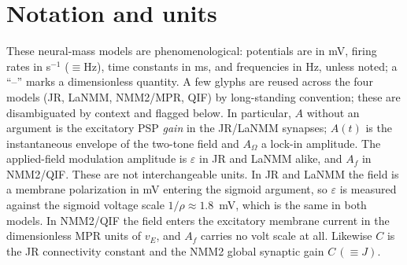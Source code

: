 \documentclass[11pt,a4paper]{article}
\newif\ifappendices
\begin{document}
\fi
\ifappendices
\clearpage
\appendix
\renewcommand{\thefigure}{S\arabic{figure}}
\setcounter{figure}{0}
\makeatletter
\let\ne@stdsection\section
\renewcommand{\section}{\clearpage\ne@stdsection}
\makeatother

\section{Notation and units}\label{app:notation}
These neural-mass models are phenomenological: potentials are in mV, firing rates in
s$^{-1}$ ($\equiv$Hz), time constants in ms, and frequencies in Hz, unless noted; a
``--'' marks a dimensionless quantity. A few glyphs are reused across the four models
(JR, LaNMM, NMM2/MPR, QIF) by long-standing convention; these are disambiguated by
context and flagged below. In particular, $A$ without an argument is the excitatory PSP \emph{gain} in the
JR/LaNMM synapses; $A(t)$ is the instantaneous envelope of the two-tone field and
$A_\Omega$ a lock-in amplitude. The applied-field modulation amplitude is
$\varepsilon$ in JR and LaNMM alike, and $A_f$ in NMM2/QIF. These are not
interchangeable units. In JR and LaNMM the field is a membrane polarization in mV
entering the sigmoid argument, so $\varepsilon$ is measured against the sigmoid voltage
scale $1/\rho\approx1.8$~mV, which is the same in both models. In NMM2/QIF the field
enters the excitatory membrane current in the dimensionless MPR units of $v_E$, and
$A_f$ carries no volt scale at all. Likewise $C$ is the JR connectivity constant and the
NMM2 global synaptic gain $C\,(\equiv J)$.
\end{document}
